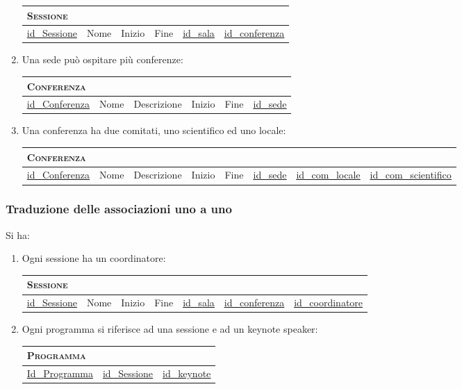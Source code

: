 \begin{enumerate}
	\begin{tabular}{|l|l|l|l|l|l|}
		\multicolumn{4}{l}{\textsc{Sessione}} \\ \hline
		\underline{id\_Sessione} & Nome & Inizio & Fine & \underline{\underline{id\_sala}}& \underline{\underline{id\_conferenza}} \\ \hline
	\end{tabular}

\item Una sede può ospitare più conferenze:

	\begin{tabular}{|l|l|l|l|l|l|}
		\multicolumn{6}{l}{\textsc{Conferenza}} \\ \hline
		\underline{id\_Conferenza} & Nome & Descrizione & Inizio & Fine & \underline{\underline{id\_sede}} \\ \hline
	\end{tabular}

\item Una conferenza ha due comitati, uno scientifico ed uno locale:

	\begin{tabular}{|l|l|l|l|l|l|l|l|}
		\multicolumn{6}{l}{\textsc{Conferenza}} \\ \hline
		\underline{id\_Conferenza} & Nome & Descrizione & Inizio & Fine & \underline{\underline{id\_sede}} & \underline{\underline{id\_com\_locale}}& \underline{\underline{id\_com\_scientifico}}\\ \hline
	\end{tabular}

\end{enumerate}

\subsubsection{Traduzione delle associazioni uno a uno}
Si ha:
\begin{enumerate}
	\item Ogni sessione ha un coordinatore:

		\begin{tabular}{|l|l|l|l|l|l|l|}
			\multicolumn{7}{l}{\textsc{Sessione}} \\ \hline
			\underline{id\_Sessione} & Nome & Inizio & Fine & \underline{\underline{id\_sala}}& \underline{\underline{id\_conferenza}} & \underline{\underline{id\_coordinatore}} \\ \hline
		\end{tabular}

\item Ogni programma si riferisce ad una sessione e ad un keynote speaker:

	\begin{tabular}{|l|l|l|}
		\multicolumn{1}{l}{\textsc{Programma}} \\ \hline
		\underline{Id\_Programma} & \underline{\underline{id\_Sessione}} & \underline{\underline{id\_keynote}}\\ \hline
	\end{tabular}
\end{enumerate}
